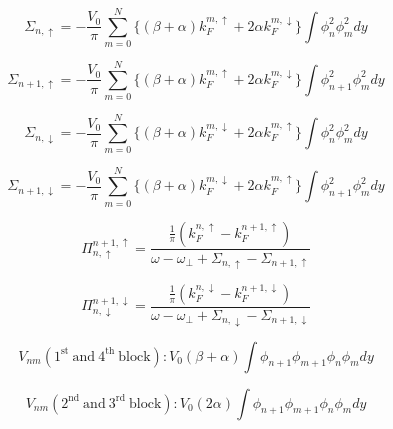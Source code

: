 \[\Sigma_{n,\uparrow}=-\frac{V_0}{\pi} \sum\limits_{m=0}^N \{(\beta+\alpha) k_F^{m,\uparrow} + 2\alpha k_F^{m,\downarrow}\} \int\phi_n^2\phi_m^2dy\]

\[\Sigma_{n+1,\uparrow}=-\frac{V_0}{\pi} \sum\limits_{m=0}^N \{(\beta+\alpha) k_F^{m,\uparrow} + 2\alpha k_F^{m,\downarrow}\} \int\phi_{n+1}^2\phi_m^2dy\]


\[\Sigma_{n,\downarrow}=-\frac{V_0}{\pi} \sum\limits_{m=0}^N \{(\beta+\alpha) k_F^{m,\downarrow} + 2\alpha k_F^{m,\uparrow}\} \int\phi_n^2\phi_m^2dy\]

\[\Sigma_{n+1,\downarrow}=-\frac{V_0}{\pi} \sum\limits_{m=0}^N \{(\beta+\alpha) k_F^{m,\downarrow} + 2\alpha k_F^{m,\uparrow}\} \int\phi_{n+1}^2\phi_m^2dy\]

\[\Pi_{n,\uparrow}^{n+1,\uparrow}=\frac{\frac{1}{\pi}(k_F^{n,\uparrow}-k_F^{n+1,\uparrow})}{\omega-\omega_{\perp}+\Sigma_{n,\uparrow}-\Sigma_{n+1,\uparrow}}\]

\[\Pi_{n,\downarrow}^{n+1,\downarrow}=\frac{\frac{1}{\pi}(k_F^{n,\downarrow}-k_F^{n+1,\downarrow})}{\omega-\omega_{\perp}+\Sigma_{n,\downarrow}-\Sigma_{n+1,\downarrow}}\]

\[V_{nm} (\mathrm{1^{st}\ and\ 4^{th}\ block}): V_0 (\beta+\alpha) \int\phi_{n+1}\phi_{m+1}\phi_n\phi_mdy\]

\[V_{nm} (\mathrm{2^{nd}\ and\ 3^{rd}\ block}): V_0 (2\alpha) \int\phi_{n+1}\phi_{m+1}\phi_n\phi_mdy\]



